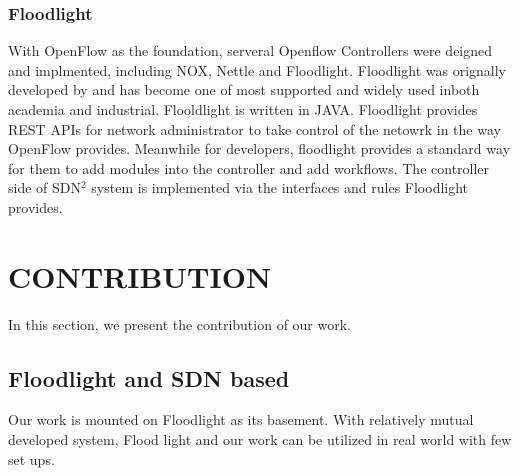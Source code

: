 \documentclass[a4paper,11pt,twocolumn]{article}
\begin{document}
\subsubsection{Floodlight}
With OpenFlow as the foundation, serveral Openflow Controllers were deigned and implmented, including NOX, Nettle and Floodlight. Floodlight was orignally developed by and has become one of most supported and widely used inboth academia and industrial. Flooldlight is written in JAVA. 
Floodlight provides REST APIs for network administrator to take control of the netowrk in the way OpenFlow provides. Meanwhile for developers, floodlight provides a standard way for them to 
add modules into the controller and add workflows. The controller side of SDN$^{2}$ system is implemented via the interfaces and rules Floodlight provides.


\section{CONTRIBUTION}
In this section, we present the contribution of our work.
\subsection{Floodlight and SDN based}
Our work is mounted on Floodlight as its basement. With relatively mutual developed system, Flood light and
our work can be utilized in real world with few set ups.


\end{document}
